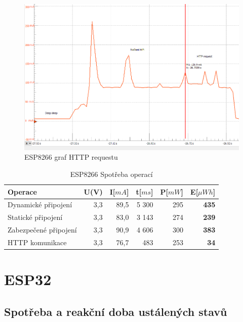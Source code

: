 \documentclass[a4paper, 12pt]{report}
\begin{document}
    \begin{figure}[h]
        \centering
        \includegraphics[width=12cm]{images/ESP8266_http}
        \caption{ESP8266 graf HTTP requestu}
        \label{fig:esp8266_http}
    \end{figure}


    \begin{table}[h]
        \centering
        \caption{ESP8266 Spotřeba operací}
        \begin{tabular}{||l| r r r r |r||}
            \hline
            Operace               & U(V) & I[$mA$] & t[$ms$] & P[$mW$] & \textbf{E}[$\mu Wh$] \\
            \hline
            \hline
            Dynamické připojení   & 3,3  & 89,5    & 5 300  & 295     & \textbf{435}         \\
            Statické připojení    & 3,3  & 83,0    & 3 143  & 274     & \textbf{239}         \\
            Zabezpečené připojení & 3,3  & 90,9    & 4 606  & 300     & \textbf{383}         \\
            HTTP komunikace       & 3,3  & 76,7    & 483     & 253     & \textbf{34}          \\
            \hline
        \end{tabular}
        \label{tab:esp8266-spotreba-operaci}
    \end{table}


    \section{ESP32}

    \subsection{Spotřeba a reakční doba ustálených stavů}
\end{document}
